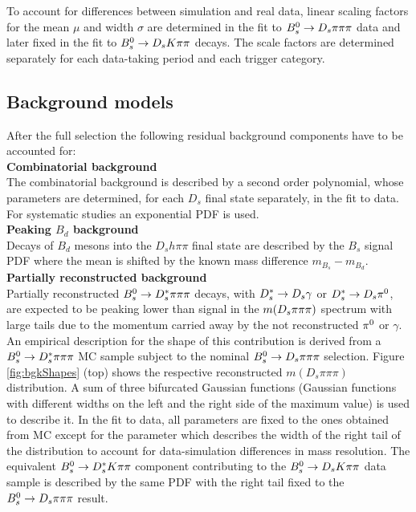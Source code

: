 To account for differences between simulation and real data, linear scaling factors for the mean $\mu$ and width $\sigma$ are determined in the fit to ${{B}^0_{s}}\rightarrow{\ensuremath{{D}_{s}}}{\ensuremath{\pi}}{\ensuremath{\pi}}{\ensuremath{\pi}}$ data  
and later fixed in the fit to ${{B}^0_{s}}\rightarrow{\ensuremath{{D}_{s}}}{\ensuremath{K}}{\ensuremath{\pi}}{\ensuremath{\pi}}$ decays. 
The scale factors are determined separately for each data-taking period and each trigger category.


\subsection{Background models} 
\label{subsec:bkgModel}

After the full selection the following residual background components have to be accounted for: \\

\noindent \textbf{Combinatorial background}  \\
The combinatorial background is described by a second order polynomial,
whose parameters are determined, for each $D_s$ final state separately, in the fit to data.
For systematic studies an exponential PDF is used.
\\

\noindent\textbf{Peaking $B_d$ background}  \\
Decays of $B_d$ mesons into the $D_s h \pi \pi$ final state are described by the $B_s$ signal PDF where the mean is shifted by the known mass difference $m_{B_s} - m_{B_d}$\cite{PDG2016}.
\\

\noindent \textbf{Partially reconstructed background}  \\
Partially reconstructed ${{B}^0_{s}}\rightarrow D_s^{*}\pi{\ensuremath{\pi}}{\ensuremath{\pi}}$ decays, with $D_s^{*}\rightarrow{\ensuremath{{D}_{s}}}\gamma$ or $D_s^{*}\rightarrow{\ensuremath{{D}_{s}}}{\ensuremath{{\pi}^0}}$,
are expected to be peaking lower than signal in the $m({{D}_{s}}{\pi}{\pi}{\pi})$ spectrum with large tails due to the %
momentum carried away by the not reconstructed ${{\pi}^0}$ or $\gamma$. 
An empirical description for the shape of this contribution is derived from a ${{B}^0_{s}}\rightarrow D_s^{*}\pi{\ensuremath{\pi}}{\ensuremath{\pi}}$ MC sample subject to the nominal ${{B}^0_{s}}\rightarrow D_s\pi{\ensuremath{\pi}}{\ensuremath{\pi}}$ selection.
Figure \ref{fig:bgkShapes} (top) shows the respective reconstructed $m(D_s\pi\pi\pi)$ distribution.
A sum of three bifurcated Gaussian functions (\ie Gaussian functions with different widths on the left and the right side of the maximum value) is used to describe it.
In the fit to data, all parameters are fixed to the ones obtained from MC except for the parameter which describes the width of the right tail of the distribution to account for
data-simulation differences in mass resolution.
The equivalent ${{B}^0_{s}}\rightarrow D_s^{*}K{\pi}{\pi}$ component contributing to the ${{B}^0_{s}}\rightarrow D_s K{\pi}{\pi}$ data sample is described by the same PDF with the right tail fixed to the 
${{B}^0_{s}}\rightarrow D_s \pi{\ensuremath{\pi}}{\ensuremath{\pi}}$ result.

